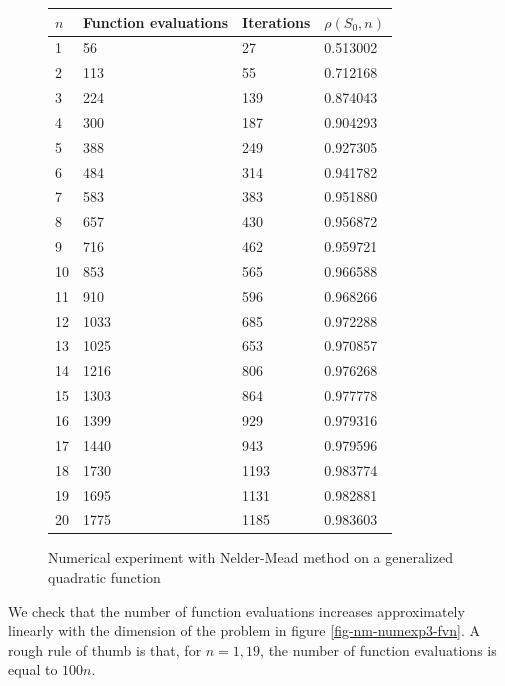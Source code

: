 \begin{figure}[htbp]
\begin{center}
\begin{tabular}{|l|l|l|l|}
\hline
$n$ & Function evaluations & Iterations & $\rho(S_0,n)$\\
\hline
1 & 56 & 27 & 0.513002 \\
2 & 113 & 55 & 0.712168 \\
3 & 224 & 139 & 0.874043 \\
4 & 300 & 187 & 0.904293 \\
5 & 388 & 249 & 0.927305 \\
6 & 484 & 314 & 0.941782 \\
7 & 583 & 383 & 0.951880 \\
8 & 657 & 430 & 0.956872 \\
9 & 716 & 462 & 0.959721 \\
10 & 853 & 565 & 0.966588 \\
11 & 910 & 596 & 0.968266 \\
12 & 1033 & 685 & 0.972288 \\
13 & 1025 & 653 & 0.970857 \\
14 & 1216 & 806 & 0.976268 \\
15 & 1303 & 864 & 0.977778 \\
16 & 1399 & 929 & 0.979316 \\
17 & 1440 & 943 & 0.979596 \\
18 & 1730 & 1193 & 0.983774 \\
19 & 1695 & 1131 & 0.982881 \\
20 & 1775 & 1185 & 0.983603 \\
\hline
\end{tabular}
\end{center}
\caption{Numerical experiment with Nelder-Mead method on a generalized quadratic function}
\label{fig-nm-numexp3-dimension}
\end{figure}

We check that the number of function evaluations 
increases approximately linearly with the dimension of the problem in
figure \ref{fig-nm-numexp3-fvn}. A rough rule of thumb is that, for $n=1,19$, 
the number of function evaluations is equal to $100n$.

